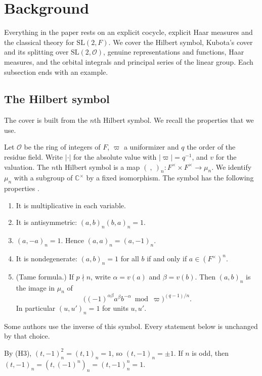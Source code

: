 \documentclass[12pt,letterpaper]{article}
\numberwithin{equation}{section}
\theoremstyle{plain}
\theoremstyle{definition}
\theoremstyle{remark}
\newcommand{\Cc}{\mathbb C}
\newcommand{\Of}{\mathcal O}
\newcommand{\SL}{\mathrm{SL}}
\begin{document}
\section{Background}\label{sec:background}

Everything in the paper rests on an explicit cocycle, explicit Haar
measures and the classical theory for $\SL(2,F)$. We cover the Hilbert
symbol, Kubota's cover and its splitting over $\SL(2,\Of)$, genuine
representations and functions, Haar measures, and the orbital integrals
and principal series of the linear group. Each subsection ends with an
example.

\subsection{The Hilbert symbol}\label{subsec:hilbert}

The cover is built from the $n$th Hilbert symbol. We recall the
properties that we use.

Let $\Of$ be the ring of integers of $F$, $\varpi$ a uniformizer and
$q$ the order of the residue field. Write $|\cdot|$ for the absolute
value with $|\varpi|=q^{-1}$, and $v$ for the valuation. The $n$th
Hilbert symbol is a map $(\ ,\ )_n:F^\times\times F^\times\to\mu_n$. We
identify $\mu_n$ with a subgroup of $\Cc^\times$ by a fixed
isomorphism. The symbol has the following properties
\cite[Ch.~III, \S5]{Ne86}.
\begin{enumerate}[label=(H\arabic*),leftmargin=*]
\item It is multiplicative in each variable.
\item It is antisymmetric: $(a,b)_n(b,a)_n=1$.
\item $(a,-a)_n=1$. Hence $(a,a)_n=(a,-1)_n$.
\item It is nondegenerate: $(a,b)_n=1$ for all $b$ if and only if
  $a\in(F^\times)^n$.
\item (Tame formula.) If $p\nmid n$, write $\alpha=v(a)$ and
  $\beta=v(b)$. Then $(a,b)_n$ is the image in $\mu_n$ of
  \[
  \bigl((-1)^{\alpha\beta}a^\beta b^{-\alpha}\bmod\varpi\bigr)^{(q-1)/n}.
  \]
  In particular $(u,u')_n=1$ for units $u,u'$.
\end{enumerate}
Some authors use the inverse of this symbol. Every statement below is
unchanged by that choice.

By (H3), $(t,-1)_n^2=(t,1)_n=1$, so $(t,-1)_n=\pm1$. If $n$ is odd,
then $(t,-1)_n=(t,(-1)^n)_n=(t,-1)_n^n=1$.
\end{document}
